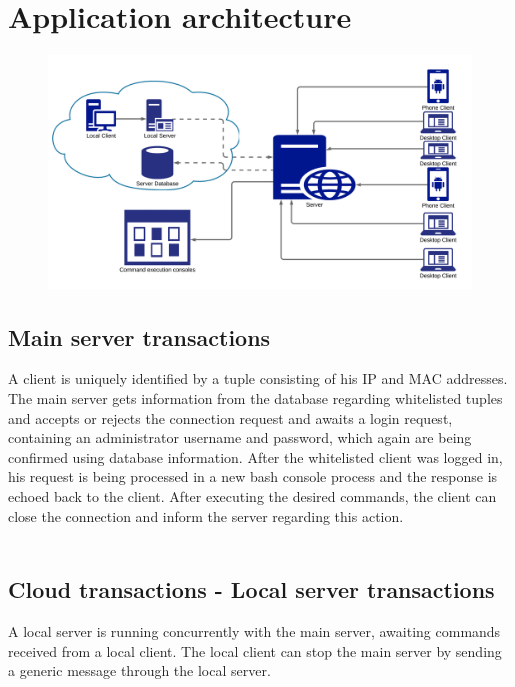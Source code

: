 \documentclass[runningheads]{llncs}
\begin{document}
\section{Application architecture}

\begin{figure}[H]
\centering
\includegraphics[width=150mm]{Network Diagram.png}
\end{figure}

\subsection{Main server transactions}
A client is uniquely identified by a tuple consisting of his IP and MAC addresses. The main server gets information from the database regarding whitelisted tuples and accepts or rejects the connection request and awaits a login request, containing an administrator username and password, which again are being confirmed using database information.
After the whitelisted client was logged in, his request is being processed in a new bash console process and the response is echoed back to the client. After executing the desired commands, the client can close the connection and inform the server regarding this action.\\\\

\subsection{Cloud transactions - Local server transactions}
A local server is running concurrently with the main server, awaiting commands received from a local client. The local client can stop the main server by sending a generic message through the local server.\\
\end{document}
